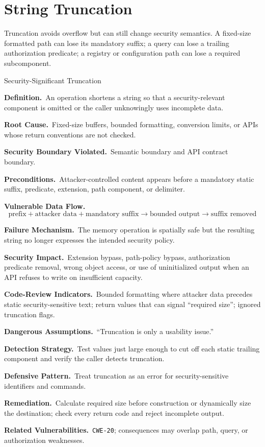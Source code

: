 \documentclass[11pt]{article}
\newcommand{\field}[1]{\par\smallskip\noindent\textbf{#1.}\ }
\newcommand{\cwe}[1]{\texttt{#1}}
\begin{document}
\section{String Truncation}

Truncation avoids overflow but can still change security semantics. A fixed-size formatted path can lose its mandatory suffix; a query can lose a trailing authorization predicate; a registry or configuration path can lose a required subcomponent.

\begin{catalogbox}{Security-Significant Truncation}
\field{Definition}An operation shortens a string so that a security-relevant component is omitted or the caller unknowingly uses incomplete data.

\field{Root Cause}Fixed-size buffers, bounded formatting, conversion limits, or APIs whose return conventions are not checked.

\field{Security Boundary Violated}Semantic boundary and API contract boundary.

\field{Preconditions}Attacker-controlled content appears before a mandatory static suffix, predicate, extension, path component, or delimiter.

\field{Vulnerable Data Flow}
\[
\text{prefix} + \text{attacker data} + \text{mandatory suffix}
\rightarrow \text{bounded output}
\rightarrow \text{suffix removed}
\]

\field{Failure Mechanism}The memory operation is spatially safe but the resulting string no longer expresses the intended security policy.

\field{Security Impact}Extension bypass, path-policy bypass, authorization predicate removal, wrong object access, or use of uninitialized output when an API refuses to write on insufficient capacity.

\field{Code-Review Indicators}Bounded formatting where attacker data precedes static security-sensitive text; return values that can signal ``required size''; ignored truncation flags.

\field{Dangerous Assumptions}``Truncation is only a usability issue.''

\field{Detection Strategy}Test values just large enough to cut off each static trailing component and verify the caller detects truncation.

\field{Defensive Pattern}Treat truncation as an error for security-sensitive identifiers and commands.

\field{Remediation}Calculate required size before construction or dynamically size the destination; check every return code and reject incomplete output.

\field{Related Vulnerabilities}\cwe{CWE-20}; consequences may overlap path, query, or authorization weaknesses.
\end{catalogbox}
\end{document}
